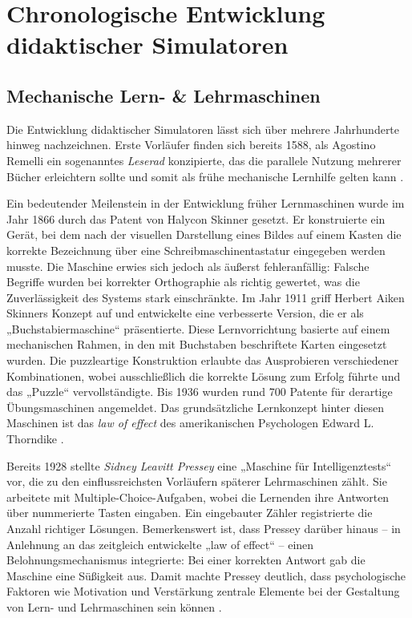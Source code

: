 \section{Chronologische Entwicklung didaktischer Simulatoren}\label{chap:3-2-development-sim}


\subsection{Mechanische Lern- \& Lehrmaschinen}

Die Entwicklung didaktischer Simulatoren lässt sich über mehrere Jahrhunderte hinweg nachzeichnen. Erste Vorläufer finden sich bereits 1588, als Agostino Remelli ein sogenanntes \textit{Leserad} konzipierte, das die parallele Nutzung mehrerer Bücher erleichtern sollte und somit als frühe mechanische Lernhilfe gelten kann \parencite{cayetano_geschichte_2022}.

Ein bedeutender Meilenstein in der Entwicklung früher Lernmaschinen wurde im Jahr 1866 durch das Patent von Halycon Skinner gesetzt. Er konstruierte ein Gerät, bei dem nach der visuellen Darstellung eines Bildes auf einem Kasten die korrekte Bezeichnung über eine Schreibmaschinentastatur eingegeben werden musste. Die Maschine erwies sich jedoch als äußerst fehleranfällig: Falsche Begriffe wurden bei korrekter Orthographie als richtig gewertet, was die Zuverlässigkeit des Systems stark einschränkte. Im Jahr 1911 griff Herbert Aiken Skinners Konzept auf und entwickelte eine verbesserte Version, die er als „Buchstabiermaschine“ präsentierte. Diese Lernvorrichtung basierte auf einem mechanischen Rahmen, in den mit Buchstaben beschriftete Karten eingesetzt wurden. Die puzzleartige Konstruktion erlaubte das Ausprobieren verschiedener Kombinationen, wobei ausschließlich die korrekte Lösung zum Erfolg führte und das „Puzzle“ vervollständigte. Bis 1936 wurden rund 700 Patente für derartige Übungsmaschinen angemeldet. Das grundsätzliche Lernkonzept hinter diesen Maschinen ist das \textit{law of effect} des amerikanischen Psychologen Edward L. Thorndike \parencite[S.~3]{niegemann_kompendium_2008}.

Bereits 1928 stellte \textit{Sidney Leavitt Pressey} eine „Maschine für Intelligenztests“ vor, die zu den einflussreichsten Vorläufern späterer Lehrmaschinen zählt. Sie arbeitete mit Multiple-Choice-Aufgaben, wobei die Lernenden ihre Antworten über nummerierte Tasten eingaben. Ein eingebauter Zähler registrierte die Anzahl richtiger Lösungen. Bemerkenswert ist, dass Pressey darüber hinaus -- in Anlehnung an das zeitgleich entwickelte „law of effect“ -- einen Belohnungsmechanismus integrierte: Bei einer korrekten Antwort gab die Maschine eine Süßigkeit aus. Damit machte Pressey deutlich, dass psychologische Faktoren wie Motivation und Verstärkung zentrale Elemente bei der Gestaltung von Lern- und Lehrmaschinen sein können \parencites[S.~705]{benjamin_history_1988}[S.~969f]{skinner_teaching_1958}.

